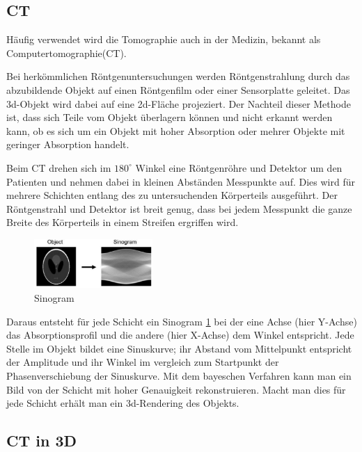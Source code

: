 \documentclass[]{dsadokumentation}
\begin{document}
\subsection{CT}

Häufig verwendet wird die Tomographie auch in der Medizin, bekannt als Computertomographie(CT).

Bei herkömmlichen Röntgenuntersuchungen werden Röntgenstrahlung durch das abzubildende Objekt auf einen Röntgenfilm oder einer Sensorplatte geleitet. Das 3d-Objekt wird dabei auf eine 2d-Fläche projeziert. Der Nachteil dieser Methode ist, dass sich Teile vom Objekt überlagern können und nicht erkannt werden kann, ob es sich um ein Objekt mit hoher Absorption oder mehrer Objekte mit geringer Absorption handelt.

Beim CT drehen sich im $180^\circ$ Winkel eine Röntgenröhre und Detektor um den Patienten und nehmen dabei in kleinen Abständen Messpunkte auf. Dies wird für mehrere Schichten entlang des zu untersuchenden Körperteils ausgeführt. Der Röntgenstrahl und Detektor ist breit genug, dass bei jedem Messpunkt die ganze Breite des Körperteils in einem Streifen ergriffen wird.

\begin{figure}
  \includegraphics[width=0.4\textwidth]{k4.2/backprojektion.png}
  \caption{Sinogram}
  \label{k4.2.tomo.ct.bp}
\end{figure}

Daraus entsteht für jede Schicht ein Sinogram \cref{k4.2.tomo.ct.bp} bei der eine Achse (hier Y-Achse) das Absorptionsprofil und die andere (hier X-Achse) dem Winkel entspricht. Jede Stelle im Objekt bildet eine Sinuskurve; ihr Abstand vom Mittelpunkt entspricht der Amplitude und ihr Winkel im vergleich zum Startpunkt der Phasenverschiebung der Sinuskurve. Mit dem bayeschen Verfahren  kann man ein Bild von der Schicht mit hoher Genauigkeit rekonstruieren. Macht man dies für jede Schicht erhält man ein 3d-Rendering des Objekts.

\subsection{CT in 3D}
\end{document}
